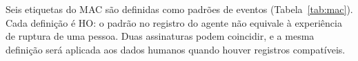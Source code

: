 Seis etiquetas do MAC \cite{mac} são definidas como padrões de eventos (Tabela~\ref{tab:mac}). Cada definição é HO: o padrão no registro do agente não equivale à experiência de ruptura de uma pessoa. Duas assinaturas podem coincidir, e a mesma definição será aplicada aos dados humanos quando houver registros compatíveis.

